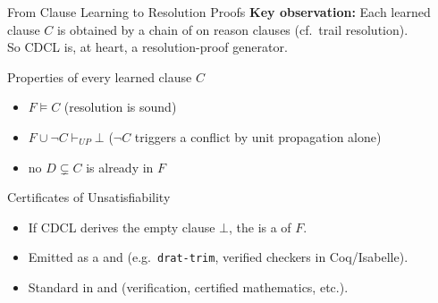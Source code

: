 \documentclass[t]{sdqbeamer}
\begin{document}
			
\begin{frame}{From Clause Learning to Resolution Proofs}
\textbf{Key observation:} Each learned clause $C$ is obtained by a chain of  on reason clauses (cf.\ trail resolution).\\
So CDCL is, at heart, a resolution-proof generator.\\[1ex]
\begin{blueblock}{Properties of every learned clause $C$}
\begin{itemize}\setlength{\itemsep}{1ex}
	\item {} $F \models C$ \hfill (resolution is sound)
	\item {} $F \cup \lnot C \vdash_{UP} \bot$ \hfill ($\lnot C$ triggers a conflict by unit propagation alone)
	\item {} no $D \subsetneq C$ is already in $F$
\end{itemize}
\end{blueblock}
\begin{blueblock}{Certificates of Unsatisfiability}
\begin{itemize}\setlength{\itemsep}{1ex}
	\item If CDCL derives the empty clause $\bot$, the  is a  of $F$.
	\item Emitted as a  and  (e.g.\ \texttt{drat-trim}, verified checkers in Coq/Isabelle).
	\item Standard in  and  (verification, certified mathematics, etc.).
\end{itemize}
\end{blueblock}
\end{frame}
\end{document}
